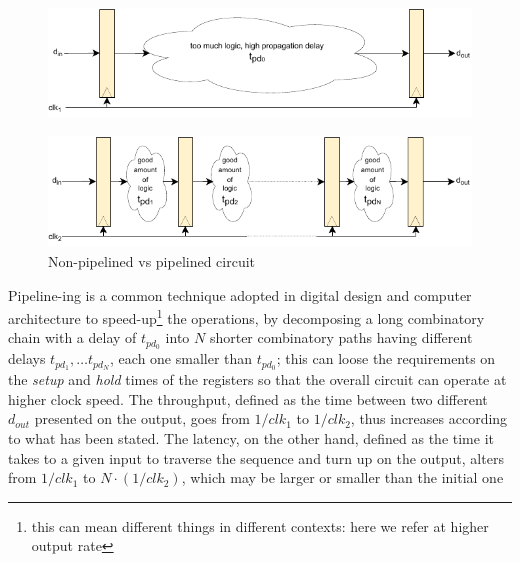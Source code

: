 \begin{figure}
    \centering
    \includegraphics[width=1\textwidth]{figures/pipeline_drawio1.pdf}
\end{figure}
\begin{figure}
    \includegraphics[width=1\textwidth]{figures/pipeline_drawio2.pdf}
    \caption{Non-pipelined vs pipelined circuit} 
    \label{fig:pipeline_vs_nonpipeline}
\end{figure}

Pipeline-ing is a common technique adopted in digital design and computer architecture to speed-up\footnote{this can mean different things in different contexts: here we refer at higher output rate} the operations, by decomposing a long combinatory chain with a delay of $t_{pd_0}$ into $N$ shorter combinatory paths having different delays $t_{pd_1}, \dots t_{pd_{N}}$, each one smaller than $t_{pd_0}$; this can loose the requirements on the \textit{setup} and \textit{hold} times of the registers so that the overall circuit can operate at higher clock speed. The throughput, defined as the time between two different $d_{out}$ presented on the output, goes from $1/clk_1$ to $1/clk_2$, thus increases according to what has been stated.
        The latency, on the other hand, defined as the time it takes to a given input to traverse the sequence and turn up on the output, alters from $1/clk_1$ to $N \cdot (1/clk_2)$, which may be larger or smaller than the initial one

